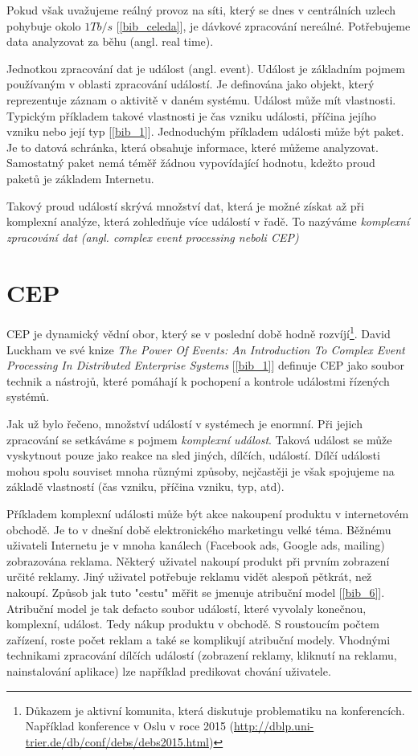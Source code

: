 \documentclass[
  digital, %
  table,   %
  nolof,     %
  nolot,     %
  oneside, %
  nocover,
  monochrome,
  12pt
]{fithesis3}
\begin{document}
Pokud však uvažujeme reálný provoz na síti, který se dnes v centrálních uzlech pohybuje okolo $1 Tb/s$
[\ref{bib_celeda}], je dávkové zpracování nereálné. Potřebujeme data analyzovat za běhu (angl. real time).

Jednotkou zpracování dat je událost (angl. event). Událost je základním pojmem používaným v oblasti zpracování událostí. Je definována jako objekt, který reprezentuje záznam o aktivitě v daném systému. Událost může mít vlastnosti. Typickým příkladem takové vlastnosti je čas vzniku události, příčina jejího vzniku nebo její typ [\ref{bib_1}]. Jednoduchým příkladem události může být paket. Je to datová schránka, která obsahuje informace, které můžeme analyzovat. Samostatný paket nemá téměř žádnou vypovídající hodnotu, kdežto proud paketů je základem Internetu.

Takový proud událostí skrývá množství dat, která je možné získat až při komplexní analýze, která zohledňuje více událostí v řadě. To nazýváme \textit{komplexní zpracování dat (angl. complex event processing neboli CEP)}


\section{CEP}

CEP je dynamický vědní obor, který se v poslední době hodně rozvíjí\footnote{Důkazem je aktivní komunita, která diskutuje problematiku na konferencích. Například konference v Oslu v roce 2015 (\url{http://dblp.uni-trier.de/db/conf/debs/debs2015.html})}. David Luckham ve své knize \textit{The Power Of Events: An Introduction To Complex Event Processing In Distributed Enterprise Systems} [\ref{bib_1}] definuje CEP jako soubor technik a nástrojů, které pomáhají k pochopení a kontrole událostmi řízených systémů.

Jak už bylo řečeno, množství událostí v systémech je enormní. Při jejich zpracování se setkáváme s pojmem \textit{komplexní událost}. Taková událost se může vyskytnout pouze jako reakce na sled jiných, dílčích, událostí. Dílčí události mohou spolu souviset mnoha různými způsoby, nejčastěji je však spojujeme na základě vlastností (čas vzniku, příčina vzniku, typ, atd).

Příkladem komplexní události může být akce nakoupení produktu v internetovém obchodě. Je to v dnešní době elektronického marketingu velké téma. Běžnému uživateli Internetu je v mnoha kanálech (Facebook ads, Google ads, mailing) zobrazována reklama. Některý uživatel nakoupí produkt při prvním zobrazení určité reklamy. Jiný uživatel potřebuje reklamu vidět alespoň pětkrát, než nakoupí. Způsob jak tuto "cestu" měřit se jmenuje atribuční model [\ref{bib_6}]. Atribuční model je tak defacto soubor událostí, které vyvolaly konečnou, komplexní, událost. Tedy nákup produktu v obchodě. S roustoucím počtem zařízení, roste počet reklam a také se komplikují atribuční modely. Vhodnými technikami zpracování dílčích událostí (zobrazení reklamy, kliknutí na reklamu, nainstalování aplikace) lze například predikovat chování uživatele.
\end{document}
